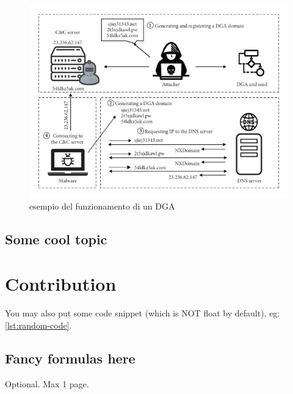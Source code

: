 \documentclass[12pt,a4paper,openright,twoside]{book}
\begin{document}
\begin{figure}
    \centering
    \includegraphics[width=.8\linewidth]{figures/DGA example.jpg}
    \caption{esempio del funzionamento di un \acrshort{DGA}}
    \label{fig:DGA example}
\end{figure}

\section{Some cool topic}

\chapter{Contribution}

You may also put some code snippet (which is NOT float by default), eg: \cref{lst:random-code}.



\section{Fancy formulas here}


\backmatter



\begin{acknowledgements} %
Optional. Max 1 page.
\end{acknowledgements}
\end{document}
